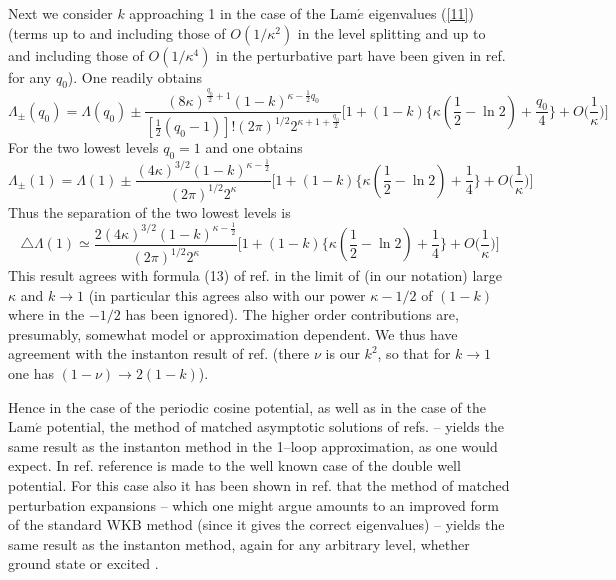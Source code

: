 \documentclass[a4paper,12pt,a4]{article}
\begin{document}
\vspace{0.2cm}

Next we consider $k$ approaching 1 in the case of the 
Lam${\acute e}$ eigenvalues (\ref{11})(terms up to  and including
those of $O(1/\kappa^2)$ in the level splitting and up
to and including those of $O(1/\kappa^4)$ in the perturbative
part have been given in ref. \cite{7} for any $q_0$).
One readily obtains
\begin{equation}
\Lambda_{\pm}(q_0)
=\Lambda (q_0)\pm\frac{(8\kappa)^{\frac{q_0}{2}+1}
(1-k)^{\kappa-\frac{1}{2}q_0}}
{[\frac{1}{2}(q_0-1)]!(2\pi)^{1/2}
2^{\kappa+1+\frac{q_0}{2}}}
\bigg[1+(1-k)\{\kappa(\frac{1}{2}-\ln 2)+\frac{q_0}{4}\}
+O\bigg(\frac{1}{\kappa}\bigg)\bigg]
\label{14}
\end{equation}
For the two lowest levels $q_0=1$ and one obtains
\begin{equation}
\Lambda_{\pm}(1)=\Lambda (1)
 \pm \frac{(4\kappa)^{3/2}(1-k)^{\kappa-\frac{1}{2}}}
{(2\pi)^{1/2}2^{\kappa}}\bigg[1+(1-k)\{\kappa(\frac{1}{2}-\ln 2)+\frac{1}{4}\}
+O\bigg(\frac{1}{\kappa}\bigg)\bigg]
\label{15}
\end{equation}
Thus the separation of the two lowest levels
is
\begin{equation}
\triangle\Lambda(1)\simeq\frac
{2(4\kappa)^{3/2}(1-k)^{\kappa-\frac{1}{2}}}
{{(2\pi)}^{1/2}2^{\kappa}}\bigg[1+(1-k)\{\kappa(\frac{1}{2}-\ln 2)+\frac{1}{4}\}
+O\bigg(\frac{1}{\kappa}\bigg)\bigg]
\label{16}
\end{equation}
This result agrees with formula (13) of ref.\cite{1} in the
limit of (in our notation) large $\kappa$ and $k\rightarrow 1$
(in particular this agrees also with our power
$\kappa-1/2$ of $(1-k)$ where in \cite{1}
the $-1/2$ has been ignored).
The higher order contributions are,
presumably, somewhat model or approximation dependent. We thus have
agreement with the instanton
result of ref.\cite{1} (there $\nu$ is our $k^2$, so that
for $k\rightarrow 1$ one has $(1-\nu)\rightarrow 2(1-k)$). 

Hence in the case of the periodic cosine potential,
as well as in the case of the Lam${\acute e}$ potential,
the method of matched asymptotic solutions  of refs.\cite{7,9} --
yields the same result as the instanton
method in the 1--loop
approximation, as one would expect.  In ref.\cite{1}
reference is made to the well known
case of the double well potential. 
For this case also it has been shown in ref. \cite{10}  that the method
of matched perturbation expansions  -- which one might argue
amounts to an improved form of the standard WKB method
(since it gives the correct eigenvalues) -- yields the
same result as the instanton method, again for any
arbitrary level, whether ground state or excited \cite{10}.  
\end{document}
